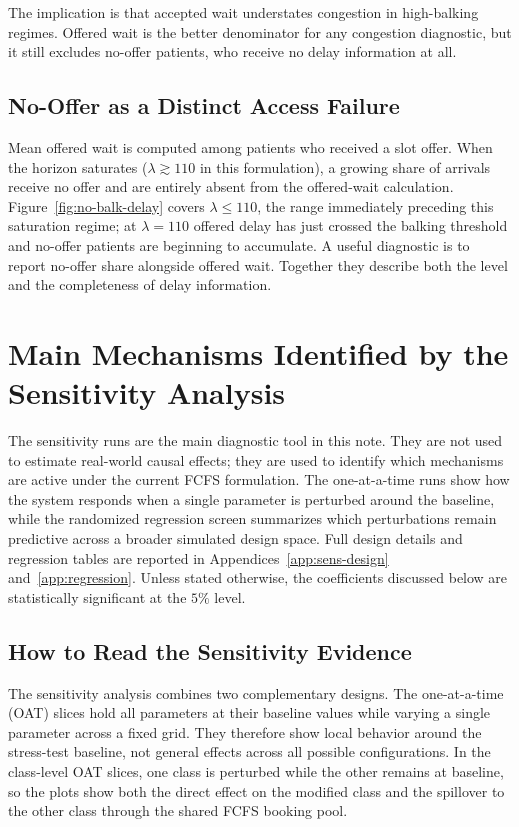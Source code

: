 \documentclass[11pt]{article}
\begin{document}
The implication is that accepted wait understates congestion in
high-balking regimes. Offered wait is the better denominator for any
congestion diagnostic, but it still excludes no-offer patients, who
receive no delay information at all.

\subsection{No-Offer as a Distinct Access Failure}

Mean offered wait is computed among patients who received a slot offer.
When the horizon saturates ($\lambda \gtrsim 110$ in this formulation),
a growing share of arrivals receive no offer and are entirely absent from
the offered-wait calculation. Figure~\ref{fig:no-balk-delay} covers
$\lambda \leq 110$, the range immediately preceding this saturation
regime; at $\lambda = 110$ offered delay has just crossed the balking
threshold and no-offer patients are beginning to accumulate. A useful
diagnostic is to report no-offer share alongside offered wait. Together
they describe both the level and the completeness of delay information.

\section{Main Mechanisms Identified by the Sensitivity Analysis}
\label{sec:sensitivity}

The sensitivity runs are the main diagnostic tool in this note. They are not
used to estimate real-world causal effects; they are used to identify which
mechanisms are active under the current FCFS formulation. The one-at-a-time
runs show how the system responds when a single parameter is perturbed around
the baseline, while the randomized regression screen summarizes which
perturbations remain predictive across a broader simulated design space. Full
design details and regression tables are reported in
Appendices~\ref{app:sens-design} and~\ref{app:regression}. Unless stated
otherwise, the coefficients discussed below are statistically significant at
the \(5\%\) level.

\subsection{How to Read the Sensitivity Evidence}

The sensitivity analysis combines two complementary designs. The
one-at-a-time (OAT) slices hold all parameters at their baseline values while
varying a single parameter across a fixed grid. They therefore show local
behavior around the stress-test baseline, not general effects across all
possible configurations. In the class-level OAT slices, one class is perturbed
while the other remains at baseline, so the plots show both the direct effect
on the modified class and the spillover to the other class through the shared
FCFS booking pool.
\end{document}
